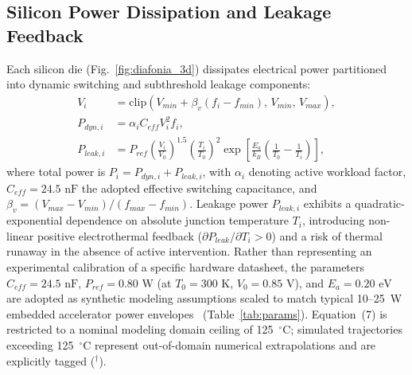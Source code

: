 \documentclass[a4paper,fleqn]{cas-dc}
\begin{document}
\subsection{Silicon Power Dissipation and Leakage Feedback}
Each silicon die (Fig.~\ref{fig:diafonia_3d}) dissipates electrical power partitioned into dynamic switching and subthreshold leakage components:
\begin{align}
V_i &= \mathrm{clip}\!\left(V_{min} + \beta_v (f_i - f_{min}),\, V_{min},\, V_{max}\right), \\
P_{dyn,i} &= \alpha_i C_{eff} V_i^2 f_i, \\
P_{leak,i} &= P_{ref} \left(\tfrac{V_i}{V_0}\right)^{1.5} \left(\tfrac{T_i}{T_0}\right)^2 \exp\!\left[\tfrac{E_a}{k_B}\left(\tfrac{1}{T_0} - \tfrac{1}{T_i}\right)\right],
\end{align}
where total power is $P_i = P_{dyn,i} + P_{leak,i}$, with $\alpha_i$ denoting active workload factor, $C_{eff} = 24.5\text{ nF}$ the adopted effective switching capacitance, and $\beta_v = (V_{max}-V_{min})/(f_{max}-f_{min})$. Leakage power $P_{leak,i}$ exhibits a quadratic-exponential dependence on absolute junction temperature $T_i$, introducing non-linear positive electrothermal feedback ($\partial P_{leak}/\partial T_i > 0$) and a risk of thermal runaway in the absence of active intervention. Rather than representing an experimental calibration of a specific hardware datasheet, the parameters $C_{eff} = 24.5\text{ nF}$, $P_{ref} = 0.80\text{ W}$ (at $T_0=300\text{ K}$, $V_0=0.85\text{ V}$), and $E_a = 0.20\text{ eV}$ are adopted as synthetic modeling assumptions scaled to match typical 10--25~W embedded accelerator power envelopes~\citep{reuther2022accelerator, kang2025power} (Table~\ref{tab:params}). Equation~(7) is restricted to a nominal modeling domain ceiling of 125~$^\circ$C; simulated trajectories exceeding 125~$^\circ$C represent out-of-domain numerical extrapolations and are explicitly tagged ($^\dagger$).
\end{document}
